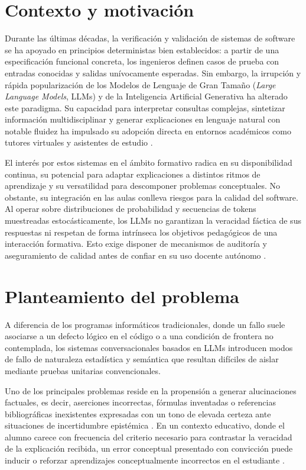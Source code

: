 \section{Contexto y motivación}
\label{sec:contexto_motivacion}
Durante las últimas décadas, la verificación y validación de sistemas de software se ha apoyado en principios deterministas bien establecidos: a partir de una especificación funcional concreta, los ingenieros definen casos de prueba con entradas conocidas y salidas unívocamente esperadas. Sin embargo, la irrupción y rápida popularización de los Modelos de Lenguaje de Gran Tamaño (\textit{Large Language Models}, LLMs) y de la Inteligencia Artificial Generativa \cite{vaswani2017attention, achiam2023gpt4} ha alterado este paradigma. Su capacidad para interpretar consultas complejas, sintetizar información multidisciplinar y generar explicaciones en lenguaje natural con notable fluidez ha impulsado su adopción directa en entornos académicos como tutores virtuales y asistentes de estudio \cite{kasneci2023chatgpt}.

El interés por estos sistemas en el ámbito formativo radica en su disponibilidad continua, su potencial para adaptar explicaciones a distintos ritmos de aprendizaje y su versatilidad para descomponer problemas conceptuales. No obstante, su integración en las aulas conlleva riesgos para la calidad del software. Al operar sobre distribuciones de probabilidad y secuencias de tokens muestreadas estocásticamente, los LLMs no garantizan la veracidad fáctica de sus respuestas ni respetan de forma intrínseca los objetivos pedagógicos de una interacción formativa. Esto exige disponer de mecanismos de auditoría y aseguramiento de calidad antes de confiar en su uso docente autónomo \cite{kasneci2023chatgpt}.

\section{Planteamiento del problema}
\label{sec:planteamiento_problema}
A diferencia de los programas informáticos tradicionales, donde un fallo suele asociarse a un defecto lógico en el código o a una condición de frontera no contemplada, los sistemas conversacionales basados en LLMs introducen modos de fallo de naturaleza estadística y semántica que resultan difíciles de aislar mediante pruebas unitarias convencionales.

Uno de los principales problemas reside en la propensión a generar alucinaciones factuales, es decir, aserciones incorrectas, fórmulas inventadas o referencias bibliográficas inexistentes expresadas con un tono de elevada certeza ante situaciones de incertidumbre epistémica \cite{kadavath2022language, ji2023survey, lin2022truthfulqa}. En un contexto educativo, donde el alumno carece con frecuencia del criterio necesario para contrastar la veracidad de la explicación recibida, un error conceptual presentado con convicción puede inducir o reforzar aprendizajes conceptualmente incorrectos en el estudiante \cite{kasneci2023chatgpt}.

